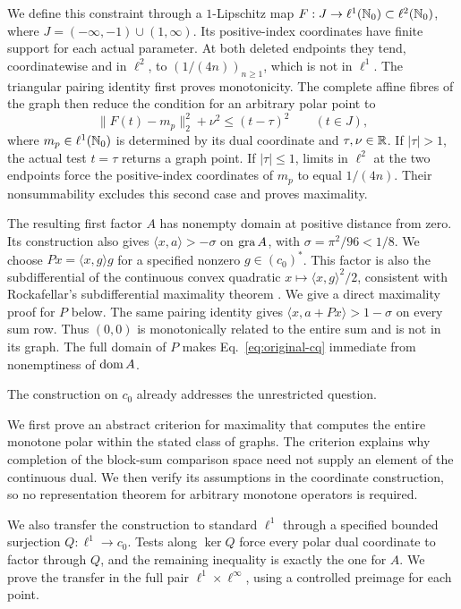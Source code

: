 We define this constraint through a $1$-Lipschitz map
$F:J\to\ell^1(\mathbb N_0)\subset\ell^2(\mathbb N_0)$, where
$J=(-\infty,-1)\cup(1,\infty)$. Its positive-index coordinates have finite
support for each actual parameter. At both deleted endpoints they tend,
coordinatewise and in $\ell^2$, to
$(1/(4n))_{n\ge1}$, which is not in $\ell^1$.
The triangular pairing identity first proves monotonicity. The complete
affine fibres of the graph then reduce the condition for an arbitrary
polar point to
\begin{equation}
\|F(t)-m_p\|_2^2+\nu^2\le(t-\tau)^2
\qquad(t\in J),
\label{eq:polar-intro}
\end{equation}
where $m_p\in\ell^1(\mathbb N_0)$ is determined by its dual coordinate and
$\tau,\nu\in\mathbb R$. If $|\tau|>1$, the actual test $t=\tau$ returns a graph
point. If $|\tau|\le1$, limits in $\ell^2$ at the two endpoints
force the positive-index coordinates of $m_p$ to equal $1/(4n)$.
Their nonsummability excludes this second case and proves maximality.

The resulting first factor $A$ has nonempty domain at positive distance
from zero. Its construction also gives
$\langle x,a\rangle>-\sigma$ on $\operatorname{gra} A$, with
$\sigma=\pi^2/96<1/8$. We choose
$Px=\langle x,g\rangle g$ for a specified nonzero $g\in(c_0)^*$.
This factor is also the subdifferential of the continuous convex quadratic
$x\mapsto\langle x,g\rangle^2/2$, consistent with Rockafellar's
subdifferential maximality theorem \cite{rockafellar1970subdiff}.
We give a direct maximality proof for $P$ below.
The same pairing identity gives
$\langle x,a+Px\rangle>1-\sigma$ on every sum row.
Thus $(0,0)$ is monotonically related to the entire sum and is not in
its graph. The full domain of $P$ makes
Eq.~\eqref{eq:original-cq} immediate from nonemptiness of $\operatorname{dom} A$.

The construction on $c_0$ already addresses the unrestricted question.

We first prove an abstract criterion for maximality that computes the
entire monotone polar within the stated class of graphs. The criterion
explains why completion of the block-sum comparison space need not supply
an element of the continuous dual. We then verify its assumptions in the
coordinate construction, so no representation theorem for arbitrary
monotone operators is required.

We also transfer the construction to standard $\ell^1$ through a specified
bounded surjection $Q:\ell^1\to c_0$. Tests along $\ker Q$ force every
polar dual coordinate to factor through $Q$, and the remaining inequality
is exactly the one for $A$. We prove the transfer in the full pair
$\ell^1\times\ell^\infty$, using a controlled preimage for each point.

